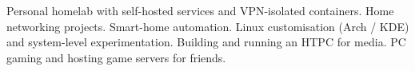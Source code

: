 

\begin{cvparagraph}

Personal homelab with self-hosted services and VPN-isolated containers. Home networking projects. Smart-home automation. Linux customisation (Arch / KDE) and system-level experimentation. Building and running an HTPC for media. PC gaming and hosting game servers for friends.
\end{cvparagraph}
